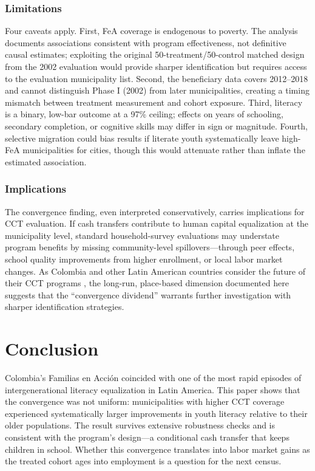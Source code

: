 \documentclass[12pt]{article}
\begin{document}
\subsubsection*{Limitations} Four caveats apply. First, FeA coverage is endogenous to poverty. The analysis documents associations consistent with program effectiveness, not definitive causal estimates; exploiting the original 50-treatment/50-control matched design from the 2002 evaluation \citep{attanasio2005effects} would provide sharper identification but requires access to the evaluation municipality list. Second, the beneficiary data covers 2012--2018 and cannot distinguish Phase I (2002) from later municipalities, creating a timing mismatch between treatment measurement and cohort exposure. Third, literacy is a binary, low-bar outcome at a 97\% ceiling; effects on years of schooling, secondary completion, or cognitive skills may differ in sign or magnitude. Fourth, selective migration could bias results if literate youth systematically leave high-FeA municipalities for cities, though this would attenuate rather than inflate the estimated association.

\subsubsection*{Implications} The convergence finding, even interpreted conservatively, carries implications for CCT evaluation. If cash transfers contribute to human capital equalization at the municipality level, standard household-survey evaluations may understate program benefits by missing community-level spillovers---through peer effects, school quality improvements from higher enrollment, or local labor market changes. As Colombia and other Latin American countries consider the future of their CCT programs \citep{parker2017conditional}, the long-run, place-based dimension documented here suggests that the ``convergence dividend'' warrants further investigation with sharper identification strategies.

\section{Conclusion}

Colombia's Familias en Acci\'{o}n coincided with one of the most rapid episodes of intergenerational literacy equalization in Latin America. This paper shows that the convergence was not uniform: municipalities with higher CCT coverage experienced systematically larger improvements in youth literacy relative to their older populations. The result survives extensive robustness checks and is consistent with the program's design---a conditional cash transfer that keeps children in school. Whether this convergence translates into labor market gains as the treated cohort ages into employment is a question for the next census.
\end{document}
